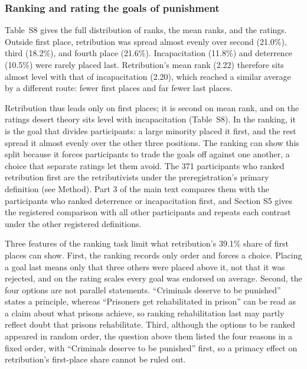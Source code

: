 \subsubsection{Ranking and rating the goals of punishment}\label{ranking-and-rating-the-goals-of-punishment}

Table~S8 gives the full distribution of ranks, the mean ranks, and the ratings. Outside first place, retribution was spread almost evenly over second (21.0\%), third (18.2\%), and fourth place (21.6\%). Incapacitation (11.8\%) and deterrence (10.5\%) were rarely placed last. Retribution's mean rank (2.22) therefore sits almost level with that of incapacitation (2.20), which reached a similar average by a different route: fewer first places and far fewer last places.

Retribution thus leads only on first places; it is second on mean rank, and on the ratings desert theory sits level with incapacitation (Table~S8). In the ranking, it is the goal that divides participants: a large minority placed it first, and the rest spread it almost evenly over the other three positions. The ranking can show this split because it forces participants to trade the goals off against one another, a choice that separate ratings let them avoid. The 371 participants who ranked retribution first are the retributivists under the preregistration's primary definition (see Method). Part 3 of the main text compares them with the participants who ranked deterrence or incapacitation first, and Section S5 gives the registered comparison with all other participants and repeats each contrast under the other registered definitions.

Three features of the ranking task limit what retribution's 39.1\% share of first places can show. First, the ranking records only order and forces a choice. Placing a goal last means only that three others were placed above it, not that it was rejected, and on the rating scales every goal was endorsed on average. Second, the four options are not parallel statements. ``Criminals deserve to be punished'' states a principle, whereas ``Prisoners get rehabilitated in prison'' can be read as a claim about what prisons achieve, so ranking rehabilitation last may partly reflect doubt that prisons rehabilitate. Third, although the options to be ranked appeared in random order, the question above them listed the four reasons in a fixed order, with ``Criminals deserve to be punished'' first, so a primacy effect on retribution's first-place share cannot be ruled out.

